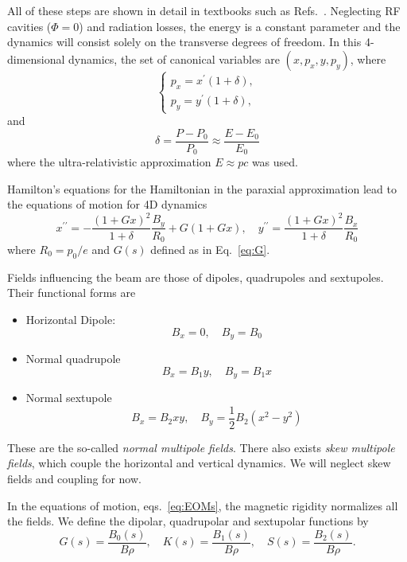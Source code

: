  All of these steps are shown in detail in textbooks such as  Refs.~\cite{lee, wiedemann,  wolski2014beam}. Neglecting RF cavities ($\Phi=0$) and radiation losses, the energy is a constant parameter and the dynamics will consist solely on the transverse degrees of freedom.
  In this 4-dimensional dynamics, the set of canonical variables are $(x,p_{x},y , p_{y})$, where
\begin{equation}\begin{cases} p_{x}= x^\prime(1+\delta),\\p_{y}=y^\prime (1+\delta),\end{cases}\end{equation}
and
\begin{equation}
    \delta = \frac{P-P_{0}}{P_{0}}\approx\frac{E-E_0}{E_0}
\end{equation}
where the ultra-relativistic approximation $E\approx pc$ was used.

Hamilton's equations for the Hamiltonian in the paraxial approximation lead to the equations of motion for 4D dynamics
\begin{equation}
x^{\prime \prime}=-\frac{(1+G x)^{2}}{1+\delta} \frac{B_{y}}{R_0}+G(1+G x),
\quad
y^{\prime \prime}=\frac{(1+G x)^{2}}{1+\delta} \frac{B_{x}}{R_0}
\label{eq:EOMs}
\end{equation}
where $R_0 = p_0/e$ and $G(s)$ defined as in Eq.~\eqref{eq:G}.

Fields influencing the beam are those of dipoles, quadrupoles and sextupoles.
Their functional forms are
\begin{itemize}
    \item Horizontal Dipole:\\
           $$ B_x = 0, \quad B_y = B_0$$
    \item Normal quadrupole\\
          $$B_x = B_1 y, \quad B_y = B_1 x$$
    \item Normal sextupole\\
          $$B_x = B_2xy, \quad B_y = \frac{1}{2}B_2(x^2 - y^2)$$
\end{itemize}
These are the so-called \textit{normal multipole fields}. There also exists \textit{skew multipole fields}, which couple the horizontal and vertical dynamics. We will neglect skew fields and coupling for now.

In the equations of motion, eqs.~\eqref{eq:EOMs}, the magnetic rigidity normalizes all the fields. We define the dipolar, quadrupolar and sextupolar functions by
\begin{equation}
    G(s) = \frac{B_0(s)}{B\rho}, \quad K(s) = \frac{B_1(s)}{B\rho}, \quad S(s) = \frac{B_2(s)}{B\rho}.
    \label{eq:mag_funcs}
\end{equation}

